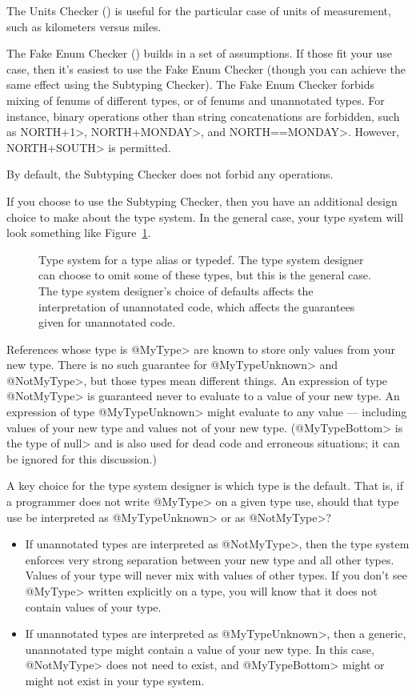 The Units Checker () is useful for the
particular case of units of measurement, such as kilometers versus miles.

The Fake Enum Checker ()
builds in a set of assumptions.  If those fit your
use case, then it's easiest to use the Fake Enum Checker (though you can
achieve the same effect using the Subtyping Checker).  The Fake Enum Checker forbids
mixing of fenums of different types, or of fenums and unannotated types.  For
instance, binary operations other than string concatenations are forbidden,
such as \<NORTH+1>, \<NORTH+MONDAY>, and \<NORTH==MONDAY>.  However,
\<NORTH+SOUTH> is permitted.

By default, the Subtyping Checker does not forbid any operations.

If you choose to use the Subtyping Checker, then you have an additional
design choice to make about the type system.  In the general case, your
type system will look something like Figure~\ref{fig-typedef-hierarchy}.

\begin{figure}
\caption{Type system for a type alias or typedef.
  The type system designer can choose to omit some of these types, but
  this is the general case.
  The type system designer's choice of defaults affects the interpretation
  of unannotated code, which affects the guarantees given for unannotated code.
  \label{fig-typedef-hierarchy}}
\end{figure}

References whose type is \<@MyType> are known to store only values from
your new type.  There is no such guarantee for \<@MyTypeUnknown> and
\<@NotMyType>, but those types mean different things.  An expression of type
\<@NotMyType> is guaranteed never to evaluate to a value of your new type.
An expression of type \<@MyTypeUnknown> might evaluate to any value ---
including values of your new type and values not of your new type.
(\<@MyTypeBottom> is the type of \<null> and is also used for dead code and
erroneous situations; it can be ignored for this
discussion.)

A key choice for the type system designer is which type is the default.
That is, if a programmer does not write \<@MyType> on a given type use,
should that type use be interpreted as \<@MyTypeUnknown> or as
\<@NotMyType>?

\begin{itemize}
\item
If unannotated types are interpreted as \<@NotMyType>, then the type system
enforces very strong separation between your new type and all other types.
Values of your type will never mix with values of other types.  If you
don't see \<@MyType> written explicitly on a type, you will know that
it does not contain values of your type.

\item
If unannotated types are interpreted as \<@MyTypeUnknown>, then
a generic, unannotated type might contain a value of your new type.
In this case, \<@NotMyType> does not need to exist, and \<@MyTypeBottom>
might or might not exist in your type system.
\end{itemize}

